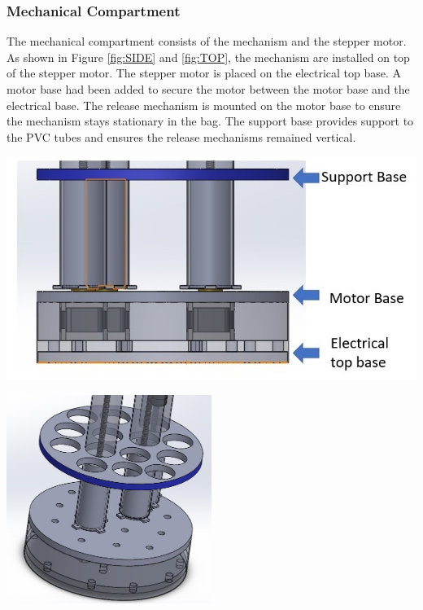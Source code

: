 \documentclass[11pt,landscape]{article}
\newenvironment{Figure}
  {\par\medskip\noindent\minipage{\linewidth}}
  {\endminipage\par\medskip}
\begin{document}
\begin{multicols}{3}
    \subsubsection{Mechanical Compartment}
    The mechanical compartment consists of the mechanism and the stepper motor.
    As shown in Figure \ref{fig:SIDE} and \ref{fig:TOP}, the mechanism are
    installed on top of the stepper motor. The stepper motor is placed on the
    electrical top base. A motor base had been added to secure the motor between
    the motor base and the electrical base. The release mechanism is mounted on
    the motor base to ensure the mechanism stays stationary in the bag. The
    support base provides support to the PVC tubes and ensures the release
    mechanisms remained vertical.

    
    \begin{Figure}
        \begin{center}
            \includegraphics[width=\textwidth]{Figure6.jpg}
            \label{fig:SIDE}
        \end{center}
    \end{Figure}
    
    \begin{Figure}
        \begin{center}
            \includegraphics[width=0.5\textwidth]{Figure7.jpg}
            \label{fig:TOP}
        \end{center}
    \end{Figure}
    

\end{multicols}
\end{document}
